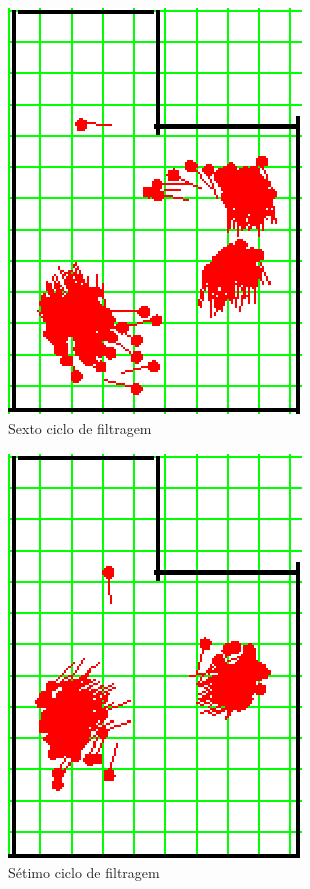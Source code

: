 \begin{figure}[H]
  \centering
  \includegraphics[scale=1]{figuras/cen1_ex3/7.eps}
  \caption[Sexto Ciclo de Filtragem]{Sexto ciclo de filtragem}
  \label{img:cen1_ex3_7}
\end{figure}

\begin{figure}[H]
  \centering
  \includegraphics[scale=1]{figuras/cen1_ex3/8.eps}
  \caption[Sétimo Ciclo de Filtragem]{Sétimo ciclo de filtragem}
  \label{img:cen1_ex3_8}
\end{figure}

